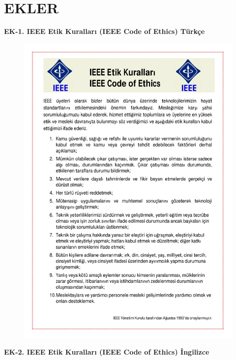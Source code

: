 \section*{EKLER}

\textbf{EK-1. IEEE Etik Kuralları (IEEE Code of Ethics) Türkçe}

\begin{figure}[H]
    \centering
    \includegraphics[width=\linewidth, height=0.6925\paperheight]{Ekler/Ek1-1.png}
    \caption*{}
\end{figure}

\newpage

\textbf{EK-2. IEEE Etik Kuralları (IEEE Code of Ethics) İngilizce}

\begin{minipage}[t]{\linewidth}
\end{minipage}


